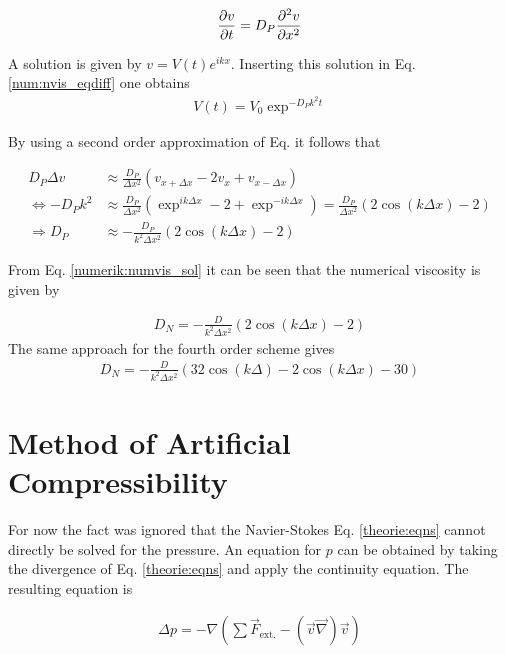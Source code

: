 \begin{align}
    \label{num:nvis_eqdiff}
    \pdn[v]{t} = D_P\pdn[^2v]{x^2}
\end{align}

A solution is given by $v = V(t)e^{ikx}$. Inserting this solution in Eq. \ref{num:nvis_eqdiff} one obtains
\begin{align}
    V(t) = V_0 \exp^{-D_Pk^2t}
\end{align}

By using a  second order approximation of Eq.  \label{num:nvis_eqdiff} it follows that

\begin{align}
                      D_P \Delta v  &\approx \frac{D_P}{\Delta x^2} \left(v_{x+\Delta x} - 2 v_x + v_{x - \Delta x}\right) \\
    \Leftrightarrow   -D_P k^2        &\approx \frac{D_P}{\Delta x^2} \left(\exp^{ik\Delta x} - 2 + \exp^{-ik\Delta x}\right) =   \frac{D_P}{\Delta x^2} \left(2\cos(k\Delta x) - 2\right)\\
    \Rightarrow   D_P      &\approx - \frac{D_P}{k^2 \Delta x^2} \left(2\cos(k\Delta x) - 2\right)
    \label{numerik:numvis_sol}
\end{align}

From Eq. \ref{numerik:numvis_sol}
it can be seen that the numerical viscosity is given by

\begin{align}
 \label{NUMERIC:NUMVIS}
    D_N = -\frac{D}{k^2 \Delta x^2} \left(2\cos(k\Delta x) - 2\right)
\end{align}
The same approach for the fourth order scheme gives
\begin{align}
 \label{NUMERIC:NUMVIS2}
    D_N = -\frac{D}{k^2 \Delta x^2} \left(32\cos(k\Delta ) - 2\cos(k\Delta x) - 30\right)
\end{align}
\clearpage



\section{Method of Artificial Compressibility}
\label{num:sec_articomp}

For now the fact was ignored that the Navier-Stokes Eq. \ref{theorie:eqns} cannot directly be solved for the pressure.
An equation for $p$ can be obtained by taking the divergence of Eq. \ref{theorie:eqns} and apply the continuity equation.
The resulting equation is \citep{QUOTE}

\begin{align}
    \Delta p =  -\nabla \left( \sum \vec{F}_{\text{ext.}} - (\vec{v} \vec{\nabla}) \vec{v}\right)
\end{align}

